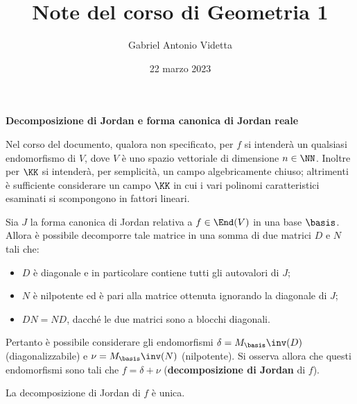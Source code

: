 \documentclass[11pt]{article}
\title{\textbf{Note del corso di Geometria 1}}
\author{Gabriel Antonio Videtta}
\date{22 marzo 2023}
\begin{document}
	
	\maketitle
	
	\begin{center}
		\Large \textbf{Decomposizione di Jordan e forma canonica di Jordan reale}
	\end{center}

	\begin{note}
		Nel corso del documento, qualora non specificato, per $f$ si intenderà un qualsiasi
		endomorfismo di $V$, dove $V$ è uno spazio vettoriale di dimensione $n \in \NN$. Inoltre
		per $\KK$ si intenderà, per semplicità, un campo algebricamente chiuso; altrimenti
		è sufficiente considerare un campo $\KK$ in cui i vari polinomi caratteristici esaminati
		si scompongono in fattori lineari.
	\end{note}

	Sia $J$ la forma canonica di Jordan relativa a $f \in \End(V)$ in una base $\basis$. Allora è possibile decomporre
	tale matrice in una somma di due matrici $D$ e $N$ tali che:
	
	\begin{itemize}
		\item $D$ è diagonale e in particolare contiene tutti gli autovalori di $J$;
		\item $N$ è nilpotente ed è pari alla matrice ottenuta ignorando la diagonale di $J$;
		\item $DN = ND$, dacché le due matrici sono a blocchi diagonali.
	\end{itemize}

	Pertanto è possibile considerare gli endomorfismi $\delta = M_\basis\inv(D)$ (diagonalizzabile) e $\nu = M_\basis\inv(N)$ (nilpotente).
	Si osserva allora che questi endomorfismi sono tali che $f = \delta + \nu$ (\textbf{decomposizione di Jordan} di $f$).
	
	\begin{theorem}
		La decomposizione di Jordan di $f$ è unica.
	\end{theorem}
\end{document}
